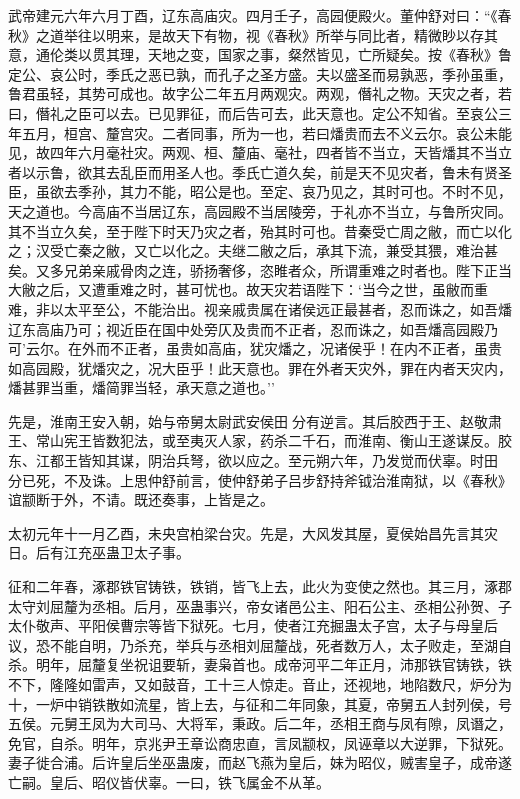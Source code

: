\documentclass[]{article}
\begin{document}
武帝建元六年六月丁酉，辽东高庙灾。四月壬子，高园便殿火。董仲舒对曰：``《春秋》之道举往以明来，是故天下有物，视《春秋》所举与同比者，精微眇以存其意，通伦类以贯其理，天地之变，国家之事，粲然皆见，亡所疑矣。按《春秋》鲁定公、哀公时，季氏之恶已孰，而孔子之圣方盛。夫以盛圣而易孰恶，季孙虽重，鲁君虽轻，其势可成也。故字公二年五月两观灾。两观，僭礼之物。天灾之者，若曰，僭礼之臣可以去。已见罪征，而后告可去，此天意也。定公不知省。至哀公三年五月，桓宫、釐宫灾。二者同事，所为一也，若曰燔贵而去不义云尔。哀公未能见，故四年六月毫社灾。两观、桓、釐庙、毫社，四者皆不当立，天皆燔其不当立者以示鲁，欲其去乱臣而用圣人也。季氏亡道久矣，前是天不见灾者，鲁未有贤圣臣，虽欲去季孙，其力不能，昭公是也。至定、哀乃见之，其时可也。不时不见，天之道也。今高庙不当居辽东，高园殿不当居陵旁，于礼亦不当立，与鲁所灾同。其不当立久矣，至于陛下时天乃灾之者，殆其时可也。昔秦受亡周之敝，而亡以化之；汉受亡秦之敝，又亡以化之。夫继二敝之后，承其下流，兼受其猥，难治甚矣。又多兄弟亲戚骨肉之连，骄扬奢侈，恣睢者众，所谓重难之时者也。陛下正当大敝之后，又遭重难之时，甚可忧也。故天灾若语陛下：`当今之世，虽敝而重难，非以太平至公，不能治出。视亲戚贵属在诸侯远正最甚者，忍而诛之，如吾燔辽东高庙乃可；视近臣在国中处旁仄及贵而不正者，忍而诛之，如吾燔高园殿乃可'云尔。在外而不正者，虽贵如高庙，犹灾燔之，况诸侯乎！在内不正者，虽贵如高园殿，犹燔灾之，况大臣乎！此天意也。罪在外者天灾外，罪在内者天灾内，燔甚罪当重，燔简罪当轻，承天意之道也。''

先是，淮南王安入朝，始与帝舅太尉武安侯田分有逆言。其后胶西于王、赵敬肃王、常山宪王皆数犯法，或至夷灭人家，药杀二千石，而淮南、衡山王遂谋反。胶东、江都王皆知其谋，阴治兵弩，欲以应之。至元朔六年，乃发觉而伏辜。时田分已死，不及诛。上思仲舒前言，使仲舒弟子吕步舒持斧钺治淮南狱，以《春秋》谊颛断于外，不请。既还奏事，上皆是之。

太初元年十一月乙酉，未央宫柏梁台灾。先是，大风发其屋，夏侯始昌先言其灾日。后有江充巫蛊卫太子事。

征和二年春，涿郡铁官铸铁，铁销，皆飞上去，此火为变使之然也。其三月，涿郡太守刘屈釐为丞相。后月，巫蛊事兴，帝女诸邑公主、阳石公主、丞相公孙贺、子太仆敬声、平阳侯曹宗等皆下狱死。七月，使者江充掘蛊太子宫，太子与母皇后议，恐不能自明，乃杀充，举兵与丞相刘屈釐战，死者数万人，太子败走，至湖自杀。明年，屈釐复坐祝诅要斩，妻枭首也。成帝河平二年正月，沛那铁官铸铁，铁不下，隆隆如雷声，又如鼓音，工十三人惊走。音止，还视地，地陷数尺，炉分为十，一炉中销铁散如流星，皆上去，与征和二年同象，其夏，帝舅五人封列侯，号五侯。元舅王凤为大司马、大将军，秉政。后二年，丞相王商与凤有隙，凤谮之，免官，自杀。明年，京兆尹王章讼商忠直，言凤颛权，凤诬章以大逆罪，下狱死。妻子徙合浦。后许皇后坐巫蛊废，而赵飞燕为皇后，妹为昭仪，贼害皇子，成帝遂亡嗣。皇后、昭仪皆伏辜。一曰，铁飞属金不从革。
\end{document}
